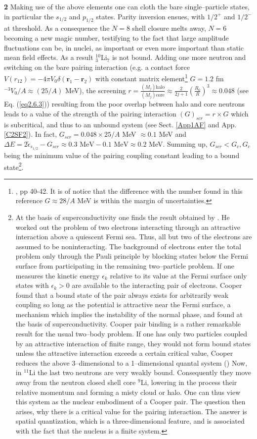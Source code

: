 \textbf{2} Making use of the above elements one can cloth the bare single--particle states, in particular the $s_{1/2}$ and $p_{1/2}$ states. Parity inversion ensues, with $1/2^+$ and $1/2^-$ at threshold. As a consequence the $N=8$ shell closure melts away, $N=6$ becoming a new magic number, testifying to the fact that  large amplitude fluctuations can be, in nuclei, as important or even more important than static mean field effects. As a result $^{10}_3$Li$_7$ is not bound. Adding one more neutron and switching on the bare pairing interaction (e.g. a contact force $V(r_{12})=-4\pi V_0\delta(\mathbf r_1-\mathbf r_2)$ with constant matrix element\footnote{\cite{Brink:05}, pp 40-42. It is of notice that the difference with the number found in this reference $G\approx28/A$ MeV is within the margin of uncertainties.} $G=1.2$ fm$^{-3}V_0/A\approx (25/A)$ MeV), the screening  $r=\frac{(M_j)\text{halo}}{(M_j)\text{core}}\approx \frac{2}{2j+1}\left(\frac{R_0}{R}\right)^3\approx 0.048$ (see Eq. (\ref{eq2.6.3})) resulting from the poor overlap between halo and core neutrons leads to  a value of the strength of the pairing interaction $(G)_{scr}=r\times G$ which is subcritical, and thus to  an unbound system (see Sect. \ref{App1AF} and App. \ref{C2SF2}). In fact, $G_{scr}=0.048\times25/A$ MeV $\approx0.1$ MeV and $\Delta E=2\tilde\epsilon_{s_{1/2}}-G_{scr}\approx0.3\text{ MeV}-0.1\text{ MeV}\approx 0.2$ MeV. Summing up, $G_{scr}<G_c, G_c$ being the minimum value of the pairing coupling constant leading to a bound state\footnote{At the basis of superconductivity one finds the result obtained by \cite{Cooper:56}. He worked out the problem of two electrons interacting through an attractive interaction above a quiescent Fermi sea. Thus, all but two of the electrons are assumed to be noninteracting. The background of electrons enter the total problem only through the Pauli principle by blocking states below the Fermi surface from participating in the remaining two--particle problem. If one measures the kinetic energy $\epsilon_k$ relative to its value at the Fermi surface only states with $\epsilon_k>0$ are available to the interacting pair of electrons. Cooper found that a bound state of the pair always exists for arbitrarily weak coupling so long as the potential is attractive near the Fermi surface, a mechanism which implies the instability of the normal phase, and found at the basis of superconductivity. Cooper pair binding is a rather remarkable result for the usual two--body problem. If one has only two particles coupled by an attractive interaction of finite range, they would not form bound states unless the attractive interaction exceeds a certain critical value, Cooper reduces the above 3--dimensional to a 1--dimensional quantal system (\cite{Gorkov:12}) Now, in $^{11}$Li the last two neutrons are very weakly bound. Consequently they move away from the neutron closed shell core $^9$Li, lowering in the process their relative momentum and forming a misty cloud or halo. One can thus view this system as the nuclear embodiment of a Cooper pair. The question then arises, why there is a critical value for the pairing interaction. The answer is spatial quantization, which is a three-dimensional feature,  and is associated with the fact that the nucleus is a finite system.}.

